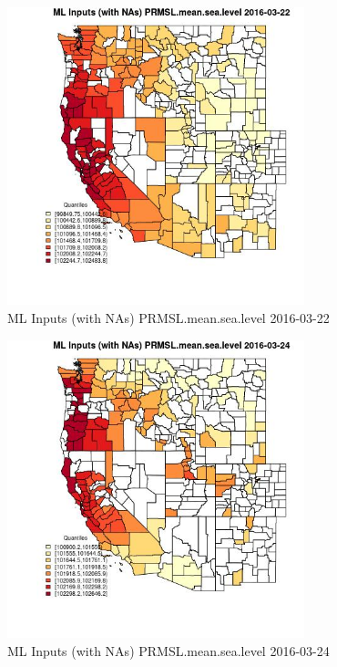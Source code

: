 \begin{figure} 
\centering  
\includegraphics[width=0.77\textwidth]{Code_Outputs/Report_ML_input_PM25_Step4_part_e_de_duplicated_aveswNAs_CountyPRMSLmeansealevelMean2016-03-22_2016-03-22.jpg} 
\caption{\label{fig:Report_ML_input_PM25_Step4_part_e_de_duplicated_aveswNAsCountyPRMSLmeansealevelMean2016-03-22_2016-03-22}ML Inputs (with NAs) PRMSL.mean.sea.level 2016-03-22} 
\end{figure} 
 

\begin{figure} 
\centering  
\includegraphics[width=0.77\textwidth]{Code_Outputs/Report_ML_input_PM25_Step4_part_e_de_duplicated_aveswNAs_CountyPRMSLmeansealevelMean2016-03-24_2016-03-24.jpg} 
\caption{\label{fig:Report_ML_input_PM25_Step4_part_e_de_duplicated_aveswNAsCountyPRMSLmeansealevelMean2016-03-24_2016-03-24}ML Inputs (with NAs) PRMSL.mean.sea.level 2016-03-24} 
\end{figure} 
 

